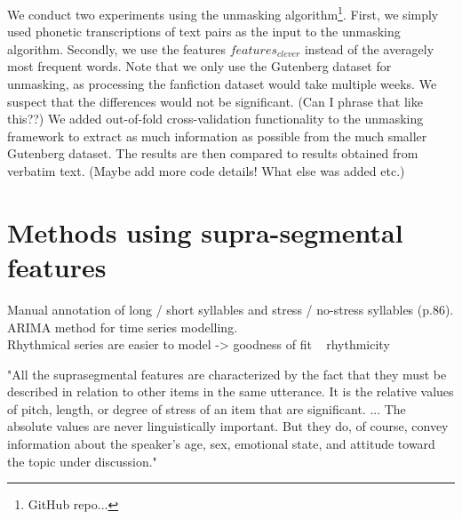 We conduct two experiments using the unmasking algorithm\footnote{GitHub repo...}.
First, we simply used phonetic transcriptions of text pairs as the input to the unmasking algorithm.
Secondly, we use the features $features_{clever}$ instead of the averagely most frequent words.
Note that we only use the Gutenberg dataset for unmasking, as processing the fanfiction dataset would take multiple weeks.
We suspect that the differences would not be significant. (Can I phrase that like this??)
We added out-of-fold cross-validation functionality to the unmasking framework to extract as much information as possible from the much smaller Gutenberg dataset.
The results are then compared to results obtained from verbatim text.
(Maybe add more code details! What else was added etc.)


\section{Methods using supra-segmental features}
Manual annotation of long / short syllables and stress / no-stress syllables (p.86).
ARIMA method for time series modelling.\\
Rhythmical series are easier to model -> goodness of fit ~ rhythmicity


"All the suprasegmental features are characterized by the fact that they must be described in relation to other items in the same utterance.
It is the relative values of pitch, length, or degree of stress of an item that are significant.
... The absolute values are never linguistically important.
But they do, of course, convey information about the speaker's age, sex, emotional state, and attitude toward the topic under discussion."\cite{ladefoged2014courseInPhonetics}

